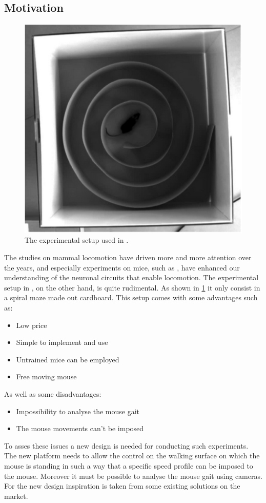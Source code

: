 \documentclass[12pt,a4paper]{article}
\begin{document}
\subsection{Motivation}
\begin{figure}
	\includegraphics[width=\linewidth]{fig/OleSetup.png}
	\caption{The experimental setup used in \cite{Ole}.}\label{fig:OleSetup}
	\vspace{-3.0 cm}
\end{figure}
The studies on mammal locomotion have driven more and more attention over the years, and especially experiments on mice, such as \cite{Ole}, have enhanced our understanding of the neuronal circuits that enable locomotion. The experimental setup in \cite{Ole}, on the other hand, is quite rudimental. As shown in \ref{fig:OleSetup} it only consist in a spiral maze made out cardboard. This setup comes with some advantages such as:
\begin{itemize}
	\item Low price
	\item Simple to implement and use
	\item Untrained mice can be employed
	\item Free moving mouse
\end{itemize}
As well as some disadvantages:
\begin{itemize}
	\item Impossibility to analyse the mouse gait
	\item The mouse movements can't be imposed
\end{itemize}
To asses these issues a new design is needed for conducting such experiments. The new platform needs to allow the control on the walking surface on which the mouse is standing in such a way that a specific speed profile can be imposed to the mouse. Moreover it must be possible to analyse the mouse gait using cameras. \\
For the new design inspiration is taken from some existing solutions on the market. 
\end{document}
